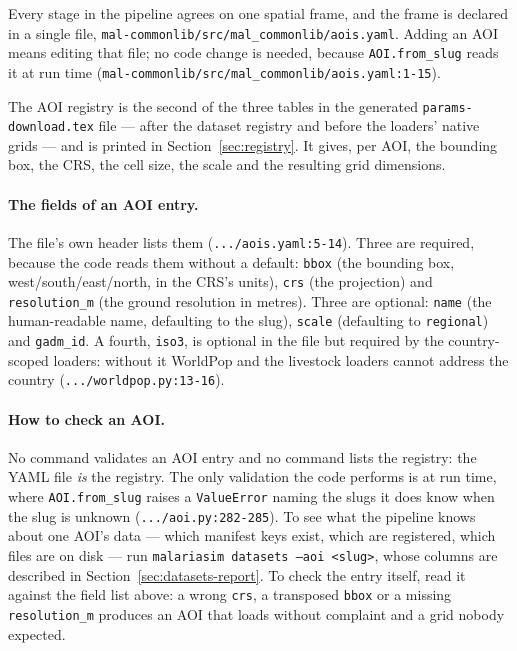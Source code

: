 \documentclass[11pt,a4paper]{article}
\newcommand{\code}[1]{\texttt{#1}}
\begin{document}
Every stage in the pipeline agrees on one spatial frame, and the frame is
declared in a single file, \code{mal-commonlib/src/mal\_commonlib/aois.yaml}.
Adding an AOI means editing that file; no code change is needed, because
\code{AOI.from\_slug} reads it at run time
(\code{mal-commonlib/src/mal\_commonlib/aois.yaml:1-15}).

The AOI registry is the second of the three tables in the generated
\code{params-download.tex} file --- after the dataset registry and before the
loaders' native grids --- and is printed in Section~\ref{sec:registry}. It
gives, per AOI, the bounding box, the CRS, the cell size, the scale and the
resulting grid dimensions.

\paragraph{The fields of an AOI entry.} The file's own header lists them
(\code{.../aois.yaml:5-14}). Three are required, because the code reads
them without a default: \code{bbox} (the bounding box, west/south/east/north,
in the CRS's units), \code{crs} (the projection) and \code{resolution\_m}
(the ground resolution in metres). Three are optional: \code{name} (the
human-readable name, defaulting to the slug), \code{scale} (defaulting to
\code{regional}) and \code{gadm\_id}. A fourth, \code{iso3}, is optional in
the file but required by the country-scoped loaders: without it WorldPop and
the livestock loaders cannot address the country
(\code{.../worldpop.py:13-16}).

\paragraph{How to check an AOI.} No command validates an AOI entry and no
command lists the registry: the YAML file \emph{is} the registry. The only
validation the code performs is at run time, where \code{AOI.from\_slug}
raises a \code{ValueError} naming the slugs it does know when the slug is
unknown (\code{.../aoi.py:282-285}). To see what the pipeline knows about
one AOI's data --- which manifest keys exist, which are registered, which
files are on disk --- run \code{malariasim datasets --aoi <slug>}, whose
columns are described in Section~\ref{sec:datasets-report}. To check the
entry itself, read it against the field list above: a wrong \code{crs}, a
transposed \code{bbox} or a missing \code{resolution\_m} produces an AOI
that loads without complaint and a grid nobody expected.
\end{document}

